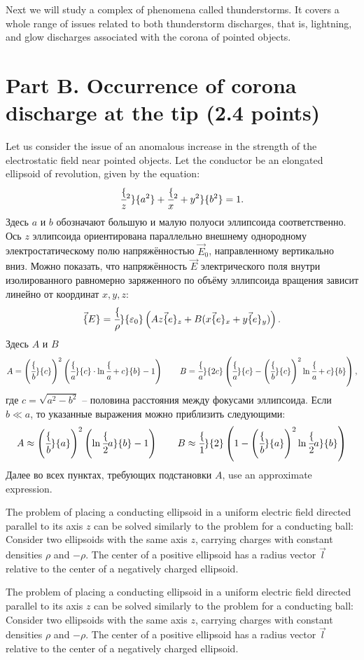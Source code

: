 \documentclass[11pt,a4paper]{article}
\begin{document}
Next we will study a complex of phenomena called thunderstorms. It covers a whole range of issues related to both thunderstorm discharges, that is, lightning, and glow discharges associated with the corona of pointed objects.

\section*{Part B. Occurrence of corona discharge at the tip (2.4 points)}

Let us consider the issue of an anomalous increase in the strength of the electrostatic field near pointed objects. Let the conductor be an elongated ellipsoid of revolution, given by the equation: $$\cfrac\{z^2\}\{a^2\}+\cfrac\{x^2+y^2\}\{b^2\}=1. $$Здесь $a$ и $b$ обозначают большую и малую полуоси эллипсоида соответственно. Ось $z$ эллипсоида ориентирована параллельно внешнему однородному электростатическому полю напряжённостью $\vec{E}_0$, направленному вертикально вниз. Можно показать, что напряжённость $\vec{E}$ электрического поля внутри изолированного равномерно заряженного по объёму эллипсоида вращения зависит линейно от координат $x{,}y{,}z$: $$\vec\{E\}=\cfrac\{\rho\}\{\varepsilon_0\}\left(Az\vec\{e\}_z+B(x\vec\{e\}_x+y\vec\{e\}_y)\right). $$Здесь $ A$ и $B$$$A=\left(\cfrac\{b\}\{c\}\right)^2\left(\cfrac\{a\}\{c\}\cdot\ln\cfrac\{a+c\}\{b\}-1\right)\qquad B=\cfrac\{a\}\{2c\}\left(\cfrac\{a\}\{c\}-\left(\cfrac\{b\}\{c\}\right)^2\ln\cfrac\{a+c\}\{b\}\right), $$где $c=\sqrt{a^2-b^2}$ – половина расстояния между фокусами эллипсоида. Если $b\ll{a}$, то указанные выражения можно приблизить следующими: $$A\approx \left(\cfrac\{b\}\{a\}\right)^2\left(\ln\cfrac\{2a\}\{b\}-1\right)\qquad B\approx\cfrac\{1\}\{2\}\left(1-\left(\cfrac\{b\}\{a\}\right)^2\ln\cfrac\{2a\}\{b\}\right) $$Далее во всех пунктах, требующих подстановки $A$, use an approximate expression.

The problem of placing a conducting ellipsoid in a uniform electric field directed parallel to its axis $z$ can be solved similarly to the problem for a conducting ball: Consider two ellipsoids with the same axis $z$, carrying charges with constant densities $\rho$ and $-\rho$. The center of a positive ellipsoid has a radius vector $\vec{l}$ relative to the center of a negatively charged ellipsoid.

The problem of placing a conducting ellipsoid in a uniform electric field directed parallel to its axis $z$ can be solved similarly to the problem for a conducting ball: Consider two ellipsoids with the same axis $z$, carrying charges with constant densities $\rho$ and $-\rho$. The center of a positive ellipsoid has a radius vector $\vec{l}$ relative to the center of a negatively charged ellipsoid.
\end{document}
